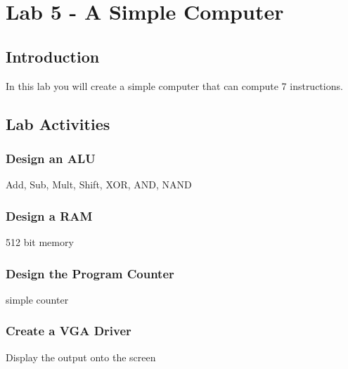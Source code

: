 \section{Lab 5 - A Simple Computer}

\subsection{Introduction}
In this lab you will create a simple computer that can compute 7 instructions. 

\subsection{Lab Activities}

\subsubsection{Design an ALU}
Add, Sub, Mult, Shift, XOR, AND, NAND

\subsubsection{Design a RAM}
512 bit memory

\subsubsection{Design the Program Counter}
simple counter

\subsubsection{Create a VGA Driver}
Display the output onto the screen
